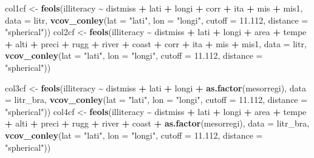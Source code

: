 \documentclass[
  a4paper,
]{article}
\newenvironment{Shaded}{\begin{snugshade}}{\end{snugshade}}
\newcommand{\AttributeTok}[1]{\textcolor[rgb]{0.13,0.29,0.53}{#1}}
\newcommand{\FloatTok}[1]{\textcolor[rgb]{0.00,0.00,0.81}{#1}}
\newcommand{\FunctionTok}[1]{\textcolor[rgb]{0.13,0.29,0.53}{\textbf{#1}}}
\newcommand{\NormalTok}[1]{#1}
\newcommand{\OtherTok}[1]{\textcolor[rgb]{0.56,0.35,0.01}{#1}}
\newcommand{\SpecialCharTok}[1]{\textcolor[rgb]{0.81,0.36,0.00}{\textbf{#1}}}
\newcommand{\StringTok}[1]{\textcolor[rgb]{0.31,0.60,0.02}{#1}}
\begin{document}
\begin{Shaded}
\begin{Highlighting}[]
\NormalTok{col1cf }\OtherTok{\textless{}{-}} \FunctionTok{feols}\NormalTok{(illiteracy }\SpecialCharTok{\textasciitilde{}}\NormalTok{ distmiss }\SpecialCharTok{+}\NormalTok{ lati }\SpecialCharTok{+}\NormalTok{ longi }\SpecialCharTok{+}\NormalTok{ corr }\SpecialCharTok{+}\NormalTok{ ita }\SpecialCharTok{+}\NormalTok{ mis }\SpecialCharTok{+}\NormalTok{ mis1, }\AttributeTok{data =}\NormalTok{ litr,}
    \FunctionTok{vcov\_conley}\NormalTok{(}\AttributeTok{lat =} \StringTok{"lati"}\NormalTok{, }\AttributeTok{lon =} \StringTok{"longi"}\NormalTok{, }\AttributeTok{cutoff =} \FloatTok{11.112}\NormalTok{, }\AttributeTok{distance =} \StringTok{"spherical"}\NormalTok{))}
\NormalTok{col2cf }\OtherTok{\textless{}{-}} \FunctionTok{feols}\NormalTok{(illiteracy }\SpecialCharTok{\textasciitilde{}}\NormalTok{ distmiss }\SpecialCharTok{+}\NormalTok{ lati }\SpecialCharTok{+}\NormalTok{ longi }\SpecialCharTok{+}\NormalTok{ area }\SpecialCharTok{+}\NormalTok{ tempe }\SpecialCharTok{+}\NormalTok{ alti }\SpecialCharTok{+}\NormalTok{ preci }\SpecialCharTok{+}
\NormalTok{    rugg }\SpecialCharTok{+}\NormalTok{ river }\SpecialCharTok{+}\NormalTok{ coast }\SpecialCharTok{+}\NormalTok{ corr }\SpecialCharTok{+}\NormalTok{ ita }\SpecialCharTok{+}\NormalTok{ mis }\SpecialCharTok{+}\NormalTok{ mis1, }\AttributeTok{data =}\NormalTok{ litr, }\FunctionTok{vcov\_conley}\NormalTok{(}\AttributeTok{lat =} \StringTok{"lati"}\NormalTok{,}
    \AttributeTok{lon =} \StringTok{"longi"}\NormalTok{, }\AttributeTok{cutoff =} \FloatTok{11.112}\NormalTok{, }\AttributeTok{distance =} \StringTok{"spherical"}\NormalTok{))}

\NormalTok{col3cf }\OtherTok{\textless{}{-}} \FunctionTok{feols}\NormalTok{(illiteracy }\SpecialCharTok{\textasciitilde{}}\NormalTok{ distmiss }\SpecialCharTok{+}\NormalTok{ lati }\SpecialCharTok{+}\NormalTok{ longi }\SpecialCharTok{+} \FunctionTok{as.factor}\NormalTok{(mesorregi), }\AttributeTok{data =}\NormalTok{ litr\_bra,}
    \FunctionTok{vcov\_conley}\NormalTok{(}\AttributeTok{lat =} \StringTok{"lati"}\NormalTok{, }\AttributeTok{lon =} \StringTok{"longi"}\NormalTok{, }\AttributeTok{cutoff =} \FloatTok{11.112}\NormalTok{, }\AttributeTok{distance =} \StringTok{"spherical"}\NormalTok{))}
\NormalTok{col4cf }\OtherTok{\textless{}{-}} \FunctionTok{feols}\NormalTok{(illiteracy }\SpecialCharTok{\textasciitilde{}}\NormalTok{ distmiss }\SpecialCharTok{+}\NormalTok{ lati }\SpecialCharTok{+}\NormalTok{ longi }\SpecialCharTok{+}\NormalTok{ area }\SpecialCharTok{+}\NormalTok{ tempe }\SpecialCharTok{+}\NormalTok{ alti }\SpecialCharTok{+}\NormalTok{ preci }\SpecialCharTok{+}
\NormalTok{    rugg }\SpecialCharTok{+}\NormalTok{ river }\SpecialCharTok{+}\NormalTok{ coast }\SpecialCharTok{+} \FunctionTok{as.factor}\NormalTok{(mesorregi), }\AttributeTok{data =}\NormalTok{ litr\_bra, }\FunctionTok{vcov\_conley}\NormalTok{(}\AttributeTok{lat =} \StringTok{"lati"}\NormalTok{,}
    \AttributeTok{lon =} \StringTok{"longi"}\NormalTok{, }\AttributeTok{cutoff =} \FloatTok{11.112}\NormalTok{, }\AttributeTok{distance =} \StringTok{"spherical"}\NormalTok{))}


\end{Highlighting}
\end{Shaded}
\end{document}
